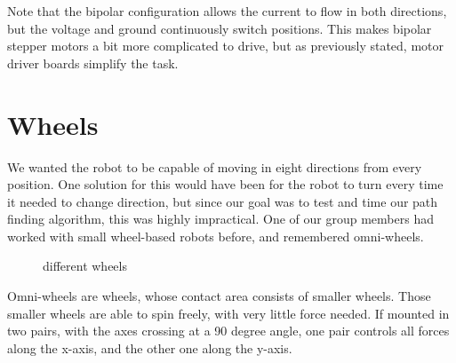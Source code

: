 Note that the bipolar configuration allows the current to flow in both directions, but the voltage and ground continuously switch positions. This makes bipolar stepper motors a bit more complicated to drive, but as previously stated, motor driver boards simplify the task.

\section{Wheels}\label{sec:wheels}
We wanted the robot to be capable of moving in eight directions from every position.
One solution for this would have been for the robot to turn every time it needed to change direction,
but since our goal was to test and time our path finding algorithm,
this was highly impractical.
One of our group members had worked with small wheel-based robots before,
and remembered omni-wheels.
\begin{figure}[htp]
	\centering
	\hfill
	\hfill
	\hfill
	\label{fig:omni}
	\caption{different wheels}
\end{figure}
Omni-wheels are wheels,
whose contact area consists of smaller wheels.
Those smaller wheels are able to spin freely,
with very little force needed.
If mounted in two pairs,
with the axes crossing at a 90 degree angle, 
one pair controls all forces along the x-axis,
and the other one along the y-axis.

